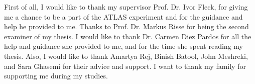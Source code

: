 \documentclass[
12pt, %
english, %
singlespacing, %
headsepline, %
]{MastersDoctoralThesis} %
\begin{document}

\begin{acknowledgements}
\addchaptertocentry{\acknowledgementname} %
First of all, I would like to thank my supervisor Prof. Dr. Ivor Fleck, for giving me a chance to be a part of the ATLAS experiment and for the guidance and help he provided to me. Thanks to Prof. Dr. Markus Risse for being the second examiner of my thesis. I would like to thank Dr. Carmen Diez Pardos for all the help and guidance she provided to me, and for the time she spent reading my thesis. Also, I would like to thank Amartya Rej, Binish Batool, John Meshreki, and Sara Ghasemi for their advice and support. I want to thank my family for supporting me during my studies.
\end{acknowledgements}


\tableofcontents %

\listoffigures %

\listoftables %



\mainmatter %

\pagestyle{thesis} %



 

 
 

\end{document}
